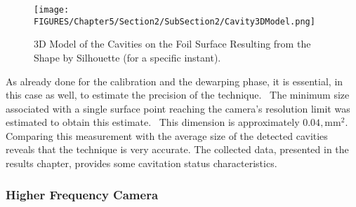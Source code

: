 \begin{figure}[htbp]
    \centering
    \texttt{[image: FIGURES/Chapter5/Section2/SubSection2/Cavity3DModel.png]}
    \caption{3D Model of the Cavities on the Foil Surface Resulting from the Shape by Silhouette (for a specific instant).}
    \label{fig:Cavity3DModel}
\end{figure}

As already done for the calibration and the dewarping phase, it is essential, in this case as well, to estimate the precision of the technique. 
The minimum size associated with a single surface point reaching the camera's resolution limit was estimated to obtain this estimate.  This dimension is approximately $0.04, \text{mm}^2$.
Comparing this measurement with the average size of the detected cavities reveals that the technique is very accurate.
The collected data, presented in the results chapter, provides some cavitation status characteristics.

\subsubsection{Higher Frequency Camera}
\label{sez:High_Frequency}

